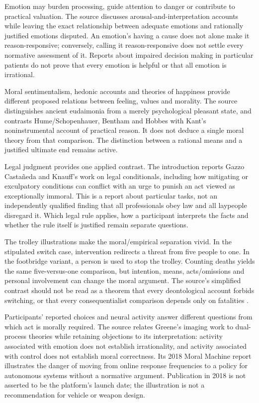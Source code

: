 Emotion may burden processing, guide attention to danger or contribute
to practical valuation. The source discusses arousal-and-interpretation
accounts while leaving the exact relationship between adequate emotions
and rationally justified emotions disputed. An emotion's having a
cause does not alone make it reason-responsive; conversely, calling
it reason-responsive does not settle every normative assessment of it.
Reports about impaired decision making in particular patients do not
prove that every emotion is helpful or that all emotion is irrational.

Moral sentimentalism, hedonic accounts and theories of happiness provide
different proposed relations between feeling, values and morality.
The source distinguishes ancient eudaimonia from a merely psychological
pleasant state, and contrasts Hume/Schopenhauer, Bentham and Hobbes
with Kant's noninstrumental account of practical reason. It does not
deduce a single moral theory from that comparison. The distinction
between a rational means and a justified ultimate end remains active.

Legal judgment provides one applied contrast. The introduction reports
Gazzo Castañeda and Knauff's work on legal conditionals, including
how mitigating or exculpatory conditions can conflict with an urge
to punish an act viewed as exceptionally immoral. This is a report
about particular tasks, not an independently qualified finding that
all professionals obey law and all laypeople disregard it. Which
legal rule applies, how a participant interprets the facts and whether
the rule itself is justified remain separate questions.

The trolley illustrations make the moral/empirical separation vivid.
In the stipulated switch case, intervention redirects a threat from
five people to one. In the footbridge variant, a person is used to
stop the trolley. Counting deaths yields the same five-versus-one
comparison, but intention, means, acts/omissions and personal involvement
can change the moral argument. The source's simplified contrast should
not be read as a theorem that every deontological account forbids
switching, or that every consequentialist comparison depends only
on fatalities \cite[pp.~48--49]{KnauffSpohn2021FrameworksIntro}.

Participants' reported choices and neural activity answer different
questions from which act is morally required. The source relates
Greene's imaging work to dual-process theories while retaining
objections to its interpretation: activity associated with emotion
does not establish irrationality, and activity associated with control
does not establish moral correctness. Its 2018 Moral Machine report
illustrates the danger of moving from online response frequencies
to a policy for autonomous systems without a normative argument.
Publication in 2018 is not asserted to be the platform's launch date;
the illustration is not a recommendation for vehicle or weapon design.

